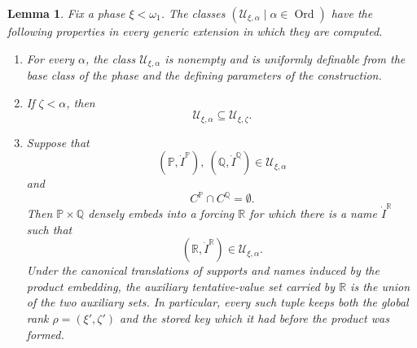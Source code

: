 \documentclass[a4paper,11pt]{article}
\newtheorem{lemma}[theorem]{Lemma}
\newcommand{\forceP}{\mathbb{P}}
\newcommand{\forceQ}{\mathbb{Q}}
\newcommand{\forceR}{\mathbb{R}}
\begin{document}
\begin{lemma}\label{UniformizationDerivativeProperties}
Fix a phase $\xi<\omega_1$. The classes $(\mathcal U_{\xi,\alpha}\mid\alpha\in\operatorname{Ord})$ have the following properties in every generic extension in which they are computed.
\begin{enumerate}
\item For every $\alpha$, the class $\mathcal U_{\xi,\alpha}$ is nonempty and is uniformly definable from the base class of the phase and the defining parameters of the construction.
\item If $\zeta<\alpha$, then
\[
\mathcal U_{\xi,\alpha}\subseteq\mathcal U_{\xi,\zeta}.
\]
\item Suppose that
\[
(\forceP,\dot I^{\forceP}),\ (\forceQ,\dot I^{\forceQ})
\in\mathcal U_{\xi,\alpha}
\]
and
\[
C^{\forceP}\cap C^{\forceQ}=\emptyset.
\]
Then $\forceP\times\forceQ$ densely embeds into a forcing $\forceR$ for which there is a name $\dot I^{\forceR}$ such that
\[
(\forceR,\dot I^{\forceR})\in\mathcal U_{\xi,\alpha}.
\]
Under the canonical translations of supports and names induced by the product embedding, the auxiliary tentative-value set carried by $\forceR$ is the union of the two auxiliary sets. In particular, every such tuple keeps both the global rank $\rho=(\xi',\zeta')$ and the stored key which it had before the product was formed.
\end{enumerate}
\end{lemma}
\end{document}
